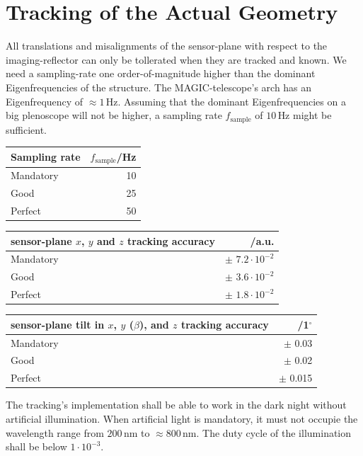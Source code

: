 \documentclass[11pt,a4paper,oneside,titlepage]{article}
\begin{document}
\section{Tracking of the Actual Geometry}
%
All translations and misalignments of the sensor-plane with respect to the imaging-reflector can only be tollerated when they are tracked and known.
%
We need a sampling-rate one order-of-magnitude higher than the dominant Eigenfrequencies of the structure.
%
The MAGIC-telescope's arch has an Eigenfrequency of $\approx 1\,$Hz.
%
Assuming that the dominant Eigenfrequencies on a big plenoscope will not be higher, a sampling rate $f_\text{sample}$ of $10\,$Hz might be sufficient.
%
\begin{table}[H]
    \begin{center}
        \begin{tabular}{lr}
            Sampling rate & $f_\text{sample}$/Hz\\
            \toprule
            Mandatory & 10\\
            Good      & 25\\
            Perfect   & 50\\
            \bottomrule
        \end{tabular}
    \end{center}
\end{table}
%
\begin{table}[H]
    \begin{center}
        \begin{tabular}{lr}
            sensor-plane $x$, $y$ and $z$ tracking accuracy &/a.u.\\
            \toprule
            Mandatory & $\pm$ $7.2 \cdot 10^{-2}$\\
            Good      & $\pm$ $3.6 \cdot 10^{-2}$\\
            Perfect   & $\pm$ $1.8 \cdot 10^{-2}$\\
            \bottomrule
        \end{tabular}
    \end{center}
\end{table}
%
\begin{table}[H]
    \begin{center}
        \begin{tabular}{lr}
            sensor-plane tilt in $x$, $y$ ($\beta$), and $z$ tracking accuracy & /1$^\circ$\\
            \toprule
            Mandatory & $\pm$ 0.03\\
            Good      & $\pm$ 0.02\\
            Perfect   & $\pm$ 0.015\\
            \bottomrule
        \end{tabular}
    \end{center}
\end{table}
%
The tracking's implementation shall be able to work in the dark night without artificial illumination.
%
When artificial light is mandatory, it must not occupie the wavelength range from $200\,$nm to $\approx 800\,$nm.
%
The duty cycle of the illumination shall be below $1\cdot10^{-3}$.
\end{document}
